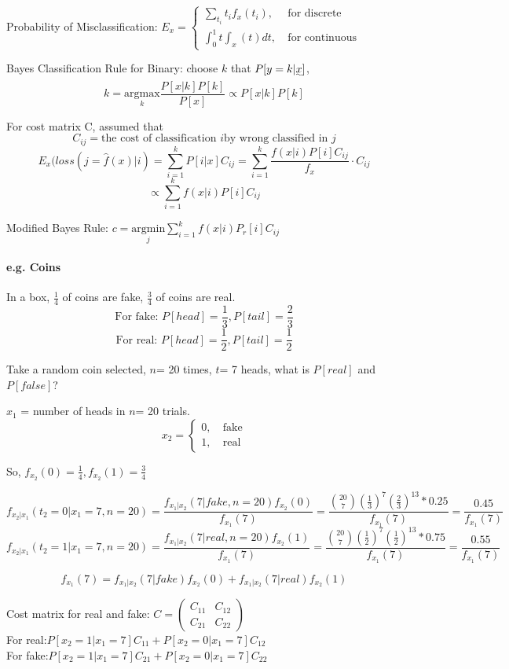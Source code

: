 \documentclass{article}
\begin{document}
{    Probability of Misclassification: \(E_x= \begin{cases}
        \sum_{t_i}t_if_x(t_i), &\   \text{for discrete} \\
        \int_{0}^{1}t\int_{x}(t)dt, &\  \text{for continuous}
    \end{cases}\)

    Bayes Classification Rule for Binary: choose $k$ that $P[y=k|\uwave{x}]$,
    \[k= \underset{k}{\mathrm{argmax}}\frac{P[x|k]P[k]}{P[x]} \propto P[x|k]P[k]\]

    For cost matrix C, assumed that
    \[C_{ij}= \text{the cost of classification } i \text{by wrong classified in } j\]
    \[E_x(loss(j=\hat{f}(x)|i)= \sum_{i=1}^{k}P[i|x]C_{ij} = \sum_{i=1}^{k}\frac{f(x|i)P[i]C_{ij}}{f_x} \cdot C_{ij}\]
    \[ \propto \sum_{i=1}^{k}f(x|i)P[i]C_{ij}\]

    Modified Bayes Rule: \(c= \underset{j}{\mathrm{argmin}}\sum_{i=1}^{k}f(x|i)P_r[i]C_{ij}\)

    \paragraph{e.g. Coins}{
        In a box, $\frac{1}{4}$ of coins are fake, $\frac{3}{4} $ of coins are real.
        \[\text{For fake: } P[head]= \frac{1}{3}, P[tail]= \frac{2}{3} \]
        \[\text{For real: } P[head]= \frac{1}{2}, P[tail]= \frac{1}{2} \]

        Take a random coin selected, $n$= 20 times, $t$= 7 heads, what is $P[real]$ and $P[false]$?

        $x_1$ = number of heads in $n$= 20 trials.
        \[x_2= \begin{cases} 
            0,  &\   \text{fake}\\ 
            1,  &\   \text{real}
        \end{cases}\]

        So, \(f_{x_2}(0)=\frac{1}{4}, f_{x_2}(1)=\frac{3}{4}\)

        \[f_{x_2|x_1}(t_2= 0|x_1=7, n= 20)=\frac{f_{x_1|x_2}(7|fake, n= 20)f_{x_2}(0)}{f_{x_1}(7)}=\frac{{20\choose 7}(\frac{1}{3})^7(\frac{2}{3})^{13}*0.25}{f_{x_1}(7)}=\frac{0.45}{f_{x_1}(7)}\]
        \[f_{x_2|x_1}(t_2= 1|x_1=7, n= 20)=\frac{f_{x_1|x_2}(7|real, n= 20)f_{x_2}(1)}{f_{x_1}(7)}=\frac{{20\choose 7}(\frac{1}{2})^7(\frac{1}{2})^{13}*0.75}{f_{x_1}(7)}=\frac{0.55}{f_{x_1}(7)}\]

        \[f_{x_1}(7)=f_{x_1|x_2}(7|fake)f_{x_2}(0)+f_{x_1|x_2}(7|real)f_{x_2}(1)\]

        Cost matrix for real and fake: \(C=\begin{pmatrix}
            C_{11} & C_{12} \\
            C_{21} & C_{22}
        \end{pmatrix}\)\\

        For real:\(P[x_2=1|x_1=7]C_{11}+P[x_2=0|x_1=7]C_{12}\)\\

        For fake:\(P[x_2=1|x_1=7]C_{21}+P[x_2=0|x_1=7]C_{22}\)\\
    }
}
\end{document}
